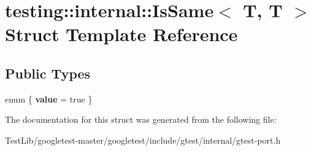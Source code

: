 \hypertarget{structtesting_1_1internal_1_1IsSame_3_01T_00_01T_01_4}{}\section{testing\+:\+:internal\+:\+:Is\+Same$<$ T, T $>$ Struct Template Reference}
\label{structtesting_1_1internal_1_1IsSame_3_01T_00_01T_01_4}
\subsection*{Public Types}
\begin{DoxyCompactItemize}
\item 
\mbox{\label{structtesting_1_1internal_1_1IsSame_3_01T_00_01T_01_4_ac0d986abcf98ce8eb16fbb9da6d1e6c4}} 
enum \{ {\bfseries value} = true
 \}
\end{DoxyCompactItemize}


The documentation for this struct was generated from the following file\+:\begin{DoxyCompactItemize}
\item 
Test\+Lib/googletest-\/master/googletest/include/gtest/internal/gtest-\/port.\+h\end{DoxyCompactItemize}
